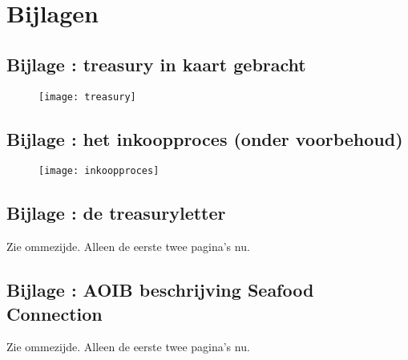 \newpage
\section*{Bijlagen}

\subsection*{\hypertarget{bij:treasury}{Bijlage \thebijlage}: \gls{treasury} in kaart gebracht}
\begin{figure}[!hb]
    \centering
    \texttt{[image: treasury]}
    \label{fig:mmtreasury}
\end{figure}

\newpage
{}
\subsection*{\hypertarget{bij:inkoopproces}{Bijlage \thebijlage}: het inkoopproces (onder voorbehoud)}
\begin{figure}[!ht]
    \centering
    \texttt{[image: inkoopproces]}
    \label{fig:inkoopproces}
\end{figure}

\newpage
{}
\subsection*{\hypertarget{bij:treasury}{Bijlage \thebijlage}: de \gls{treasuryletter}}
Zie ommezijde. {\color{red}Alleen de eerste twee pagina's nu.}


\newpage
{}
\subsection*{\hypertarget{bij:aoib}{Bijlage \thebijlage}: AOIB beschrijving Seafood Connection}
Zie ommezijde. {\color{red}Alleen de eerste twee pagina's nu.}
